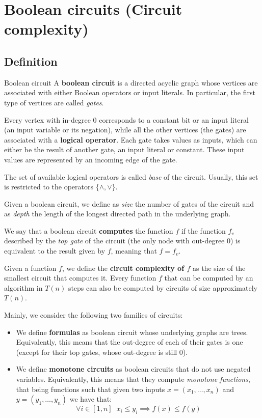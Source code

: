 \documentclass[a4paper, 12pt]{report}
\begin{document}
    \chapter{Boolean circuits (Circuit complexity)}

    \section{Definition}

    \begin{frameddefn}{Boolean circuit}
        A \textbf{boolean circuit} is a directed acyclic graph whose vertices are associated with either Boolean operators or input literals. In particular, the first type of vertices are called \textit{gates}.
        
        Every vertex with in-degree 0 corresponds to a constant bit or an input literal (an input variable or its negation), while all the other vertices (the gates) are associated with a \textbf{logical operator}. Each gate takes values as inputs, which can either be the result of another gate, an input literal or constant. These input values are represented by an incoming edge of the gate.
    \end{frameddefn}

    The set of available logical operators is called \textit{base} of the circuit. Usually, this set is restricted to the operators $\{\land, \lor\}$.
    
    Given a boolean circuit, we define as \textit{size} the number of gates of the circuit and as \textit{depth} the length of the longest directed path in the underlying graph.

    We say that a boolean circuit \textbf{computes} the function $f$ if the function $f_v$ described by the \textit{top gate} of the circuit (the only node with out-degree 0) is equivalent to the result given by $f$, meaning that $f = f_v$.

    Given a function $f$, we define the \textbf{circuit complexity of $f$} as the size of the smallest circuit that computes it. Every function $f$ that can be computed by an algorithm in $T(n)$ steps can also be computed by circuits of size approximately $T(n)$.

    Mainly, we consider the following two families of circuits:

    \begin{itemize}
        \item We define \textbf{formulas} as boolean circuit whose underlying graphs are trees. Equivalently, this means that the out-degree of each of their gates is one (except for their top gates, whose out-degree is still 0).
        
        \item We define \textbf{monotone circuits} as boolean circuits that do not use negated variables. Equivalently, this means that they compute \textit{monotone functions}, that being functions such that given two inputs $x = (x_1, \ldots, x_n)$ and $y = (y_1, \ldots, y_n)$ we have that:
        \[\forall i \in [1,n] \;\; x_i \leq y_i \implies f(x) \leq f(y)\]
    \end{itemize}
\end{document}

